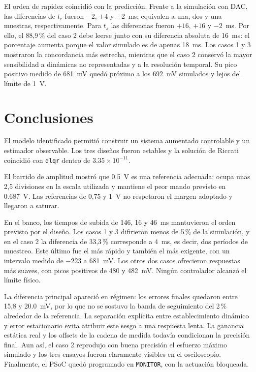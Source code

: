 \documentclass[conference]{IEEEtran}
\begin{document}
El orden de rapidez coincidió con la predicción. Frente a la simulación con DAC, las diferencias de $t_r$ fueron $-2$, $+4$ y \SI{-2}{ms}; equivalen a una, dos y una muestras, respectivamente. Para $t_s$ las diferencias fueron $+16$, $+16$ y \SI{-2}{ms}. Por ello, el 88,9\,\% del caso 2 debe leerse junto con su diferencia absoluta de \SI{16}{ms}: el porcentaje aumenta porque el valor simulado es de apenas \SI{18}{ms}. Los casos 1 y 3 mostraron la concordancia más estrecha, mientras que el caso 2 conservó la mayor sensibilidad a dinámicas no representadas y a la resolución temporal. Su pico positivo medido de \SI{681}{mV} quedó próximo a los \SI{692}{mV} simulados y lejos del límite de \SI{1}{V}.

\clearpage
\balance

\section{Conclusiones}
El modelo identificado permitió construir un sistema aumentado controlable y un estimador observable. Los tres diseños fueron estables y la solución de Riccati coincidió con \texttt{dlqr} dentro de $3.35\times10^{-11}$.

El barrido de amplitud mostró que \SI{0.5}{V} es una referencia adecuada: ocupa unas 2,5 divisiones en la escala utilizada y mantiene el peor mando previsto en \SI{0.687}{V}. Las referencias de 0,75 y \SI{1}{V} no respetaron el margen adoptado y llegaron a saturar.

En el banco, los tiempos de subida de 146, 16 y \SI{46}{ms} mantuvieron el orden previsto por el diseño. Los casos 1 y 3 difirieron menos de 5\,\% de la simulación, y en el caso 2 la diferencia de 33,3\,\% corresponde a \SI{4}{ms}, es decir, dos períodos de muestreo. Este último fue el más rápido y también el más exigente, con un intervalo medido de $-223$ a \SI{681}{mV}. Los otros dos casos ofrecieron respuestas más suaves, con picos positivos de 480 y \SI{482}{mV}. Ningún controlador alcanzó el límite físico.

La diferencia principal apareció en régimen: los errores finales quedaron entre 15,8 y \SI{20.0}{mV}, por lo que no se sostuvo la banda de seguimiento del 2\,\% alrededor de la referencia. La separación explícita entre establecimiento dinámico y error estacionario evita atribuir este sesgo a una respuesta lenta. La ganancia estática real y los offsets de la cadena de medida todavía condicionan la precisión final. Aun así, el caso 2 reprodujo con buena precisión el esfuerzo máximo simulado y los tres ensayos fueron claramente visibles en el osciloscopio. Finalmente, el PSoC quedó programado en \texttt{MONITOR}, con la actuación bloqueada.
\end{document}
